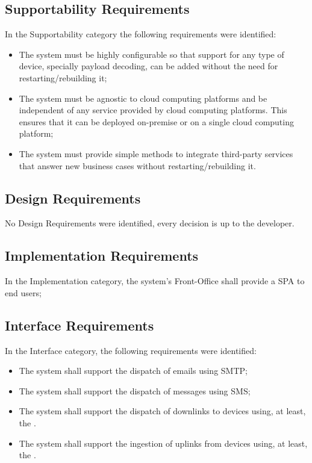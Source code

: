 \subsection{Supportability Requirements}
\label{sec:requirements:non_functional:supportability}

In the Supportability category the following requirements were identified:

\begin{itemize}
    \item The system must be highly configurable so that support for any type of device, specially payload decoding, can be added without the need for restarting/rebuilding it;
    \item The system must be agnostic to cloud computing platforms and be independent of any service provided by cloud computing platforms. This ensures that it can be deployed on-premise or on a single cloud computing platform;
    \item The system must provide simple methods to integrate third-party services that answer new business cases without restarting/rebuilding it.
\end{itemize}

\subsection{Design Requirements}
\label{sec:requirements:non_functional:design}

No Design Requirements were identified, every decision is up to the developer.

\subsection{Implementation Requirements}
\label{sec:requirements:non_functional:implementation}

In the Implementation category, the system's Front-Office shall provide a \gls{SPA} to end users;

\subsection{Interface Requirements}
\label{sec:requirements:non_functional:interface}

In the Interface category, the following requirements were identified:

\begin{itemize}
    \item The system shall support the dispatch of emails using \gls{SMTP};
    \item The system shall support the dispatch of messages using \gls{SMS};
    \item The system shall support the dispatch of downlinks to devices using, at least, the .
    \item The system shall support the ingestion of uplinks from devices using, at least, the .
\end{itemize}

